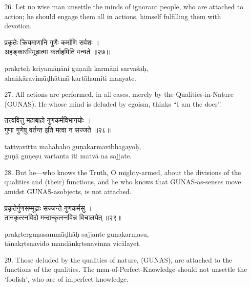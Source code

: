 26. Let no wise man unsettle the minds of ignorant people, who are attached to
action; he should engage them all in actions, himself fulfilling them with
devotion.

\begin{gitaverse}
प्रकृतेः क्रियमाणानि गुणैः कर्माणि सर्वशः । \\
अहङ्कारविमूढात्मा कर्ताहमिति मन्यते ॥२७॥
\end{gitaverse}

\begin{transliteration}
prakṛteḥ kriyamāṇāni guṇaiḥ karmāṇi sarvaśaḥ, \\
ahaṅkāravimūḍhātmā kartāhamiti manyate.
\end{transliteration}

27. All actions are performed, in all cases, merely by the Qualities-in-Nature
(GUNAS). He whose mind is deluded by egoism, thinks ``I am the doer''.

\begin{gitaverse}
तत्त्ववित्तु महाबाहो गुणकर्मविभागयोः । \\
गुणा गुणेषु वर्तन्त इति मत्वा न सज्जते ॥२८॥
\end{gitaverse}

\begin{transliteration}
tattvavittu mahābāho guṇakarmavibhāgayoḥ, \\
guṇā guṇeṣu vartanta iti matvā na sajjate.
\end{transliteration}

28. But he---who knows the Truth, O mighty-armed, about the divisions of the
qualities and (their) functions, and he who knows that GUNAS-as-senses move
amidst GUNAS-asobjects, is not attached.

\begin{gitaverse}
प्रकृतेर्गुणसम्मूढाः सज्जन्ते गुणकर्मसु । \\
तानकृत्स्नविदो मन्दान्कृत्स्नविन्न विचालयेत् ॥२९॥
\end{gitaverse}

\begin{transliteration}
prakṛterguṇasammūḍhāḥ sajjante guṇakarmasu, \\
tānakṛtsnavido mandānkṛtsnavinna vicālayet.
\end{transliteration}

29. Those deluded by the qualities of nature, (GUNAS), are attached to the
functions of the qualities. The man-of-Perfect-Knowledge should not unsettle
the `foolish', who are of imperfect knowledge.

